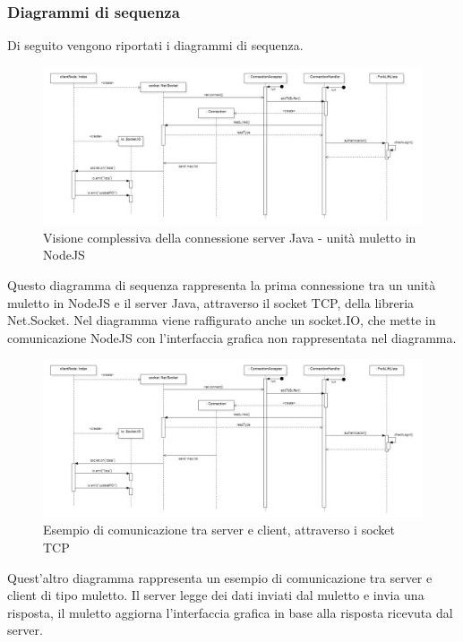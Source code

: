 
\subsubsection{Diagrammi di sequenza}
Di seguito vengono riportati i diagrammi di sequenza.
\begin{figure}[H]
	\centering
	\includegraphics[scale=0.55]{res/diagrams/sequenza/connect unit.jpg}
	\caption{Visione complessiva della connessione server Java - unità muletto in NodeJS}
\end{figure}
Questo diagramma di sequenza rappresenta la prima connessione tra un unità muletto in NodeJS e il server Java, attraverso il socket TCP, della libreria Net.Socket.
Nel diagramma viene raffigurato anche un socket.IO, che mette in comunicazione NodeJS con l'interfaccia grafica non rappresentata nel diagramma.
\begin{figure}[H]
	\centering
	\includegraphics[scale=0.55]{res/diagrams/sequenza/connect unit.jpg}
	\caption{Esempio di comunicazione tra server e client, attraverso i socket TCP}
\end{figure}
Quest'altro diagramma rappresenta un esempio di comunicazione tra server e client di tipo muletto. Il server legge dei dati inviati dal muletto e invia una risposta, il muletto aggiorna l'interfaccia grafica in base alla risposta ricevuta dal server.